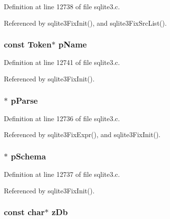 Definition at line 12738 of file sqlite3.\+c.



Referenced by sqlite3\+Fix\+Init(), and sqlite3\+Fix\+Src\+List().

\hypertarget{struct_db_fixer_a69fdc3bf044a0650328c28e0410cc6f5}{}
\subsubsection[{p\+Name}]{\setlength{\rightskip}{0pt plus 5cm}const {\bf Token}$\ast$ p\+Name}\label{struct_db_fixer_a69fdc3bf044a0650328c28e0410cc6f5}


Definition at line 12741 of file sqlite3.\+c.



Referenced by sqlite3\+Fix\+Init().

\hypertarget{struct_db_fixer_ac700bf257b32cd7e491fde90a081379d}{}
\subsubsection[{p\+Parse}]{$\ast$ p\+Parse}\label{struct_db_fixer_ac700bf257b32cd7e491fde90a081379d}


Definition at line 12736 of file sqlite3.\+c.



Referenced by sqlite3\+Fix\+Expr(), and sqlite3\+Fix\+Init().

\hypertarget{struct_db_fixer_ac262c2ca980f0326edbe82bbe7fda205}{}
\subsubsection[{p\+Schema}]{$\ast$ p\+Schema}\label{struct_db_fixer_ac262c2ca980f0326edbe82bbe7fda205}


Definition at line 12737 of file sqlite3.\+c.



Referenced by sqlite3\+Fix\+Init().

\hypertarget{struct_db_fixer_a272f317b6ecb89050b56c561e960e1aa}{}
\subsubsection[{z\+Db}]{\setlength{\rightskip}{0pt plus 5cm}const char$\ast$ z\+Db}\label{struct_db_fixer_a272f317b6ecb89050b56c561e960e1aa}


